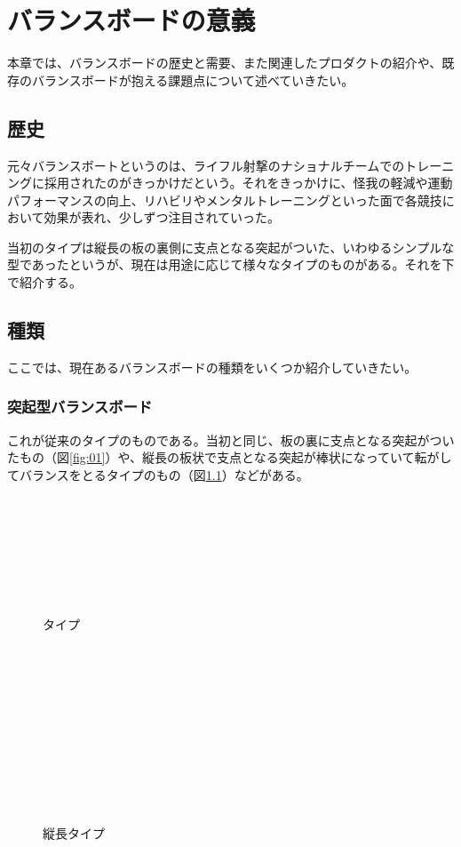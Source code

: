 \chapter{バランスボードの意義}
\label{chap:02}

本章では、バランスボードの歴史と需要、また関連したプロダクトの紹介や、既存のバランスボードが抱える課題点について述べていきたい。


\section{歴史}

元々バランスボートというのは、ライフル射撃のナショナルチームでのトレーニングに採用されたのがきっかけだという。それをきっかけに、怪我の軽減や運動パフォーマンスの向上、リハビリやメンタルトレーニングといった面で各競技において効果が表れ、少しずつ注目されていった。 \cite{hoge03}

当初のタイプは縦長の板の裏側に支点となる突起がついた、いわゆるシンプルな型であったというが、現在は用途に応じて様々なタイプのものがある。それを下で紹介する。


\section{種類}

ここでは、現在あるバランスボードの種類をいくつか紹介していきたい。

\subsection{突起型バランスボード}

これが従来のタイプのものである。当初と同じ、板の裏に支点となる突起がついたもの（図\ref{fig:01}）や、縦長の板状で支点となる突起が棒状になっていて転がしてバランスをとるタイプのもの（図\ref{fig:02}）などがある。



\begin{figure}[htbp]
　\begin{minipage}{0.5\hsize}
　　\begin{center}
　　\end{center}
　　\caption{タイプ}
　　\label{fig:01}
　\end{minipage}
　\begin{minipage}{0.5\hsize}
　　\begin{center}
　　\end{center}
　　\caption{縦長タイプ}
　　\label{fig:02}
　\end{minipage}
\end{figure}




